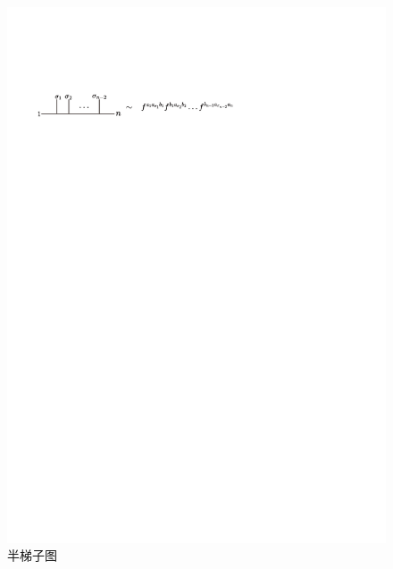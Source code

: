 \begin{figure}[htbp]
	\centering
	\includegraphics[width=0.95\linewidth]{figs/fig10.pdf}
	\caption{半梯子图}
	\label{fig:6.3}
\end{figure}

